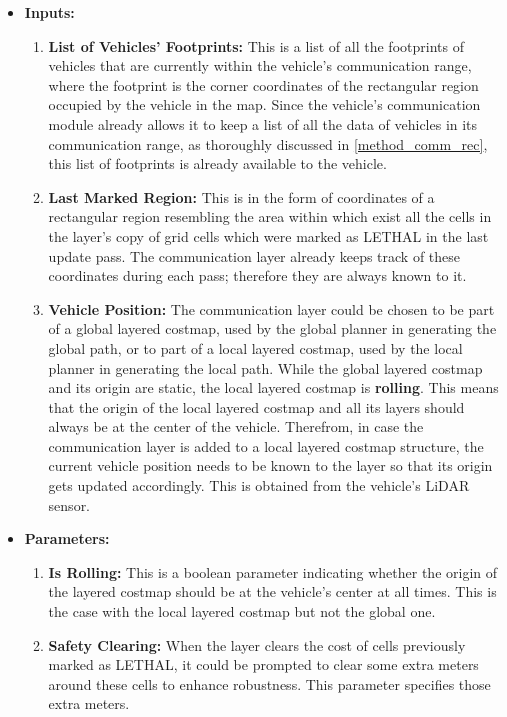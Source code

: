 \begin{enumerate}
    \begin{itemize}
        \item \textbf{Inputs:}
        \begin{enumerate}
            \item \textbf{List of Vehicles' Footprints:} This is a list of all the footprints of vehicles that are currently within the vehicle’s communication range, where the footprint is the corner coordinates of the rectangular region occupied by the vehicle in the map. Since the vehicle’s communication module already allows it to keep a list of all the data of vehicles in its communication range, as thoroughly discussed in \ref{method_comm_rec}, this list of footprints is already available to the vehicle.
            \item \textbf{Last Marked Region:} This is in the form of coordinates of a rectangular region resembling the area within which exist all the cells in the layer’s copy of grid cells which were marked as LETHAL in the last update pass. The communication layer already keeps track of these coordinates during each pass; therefore they are always known to it.
            \item \textbf{Vehicle Position:} The communication layer could be chosen to be part of a global layered costmap, used by the global planner in generating the global path, or to part of a local layered costmap, used by the local planner in generating the local path. While the global layered costmap and its origin are static, the local layered costmap is \textbf{rolling}. This means that the origin of the local layered costmap and all its layers should always be at the center of the vehicle. Therefrom, in case the communication layer is added to a local layered costmap structure, the current vehicle position needs to be known to the layer so that its origin gets updated accordingly. This is obtained from the vehicle’s LiDAR sensor.
        \end{enumerate}
        \item \textbf{Parameters:}
        \begin{enumerate}
            \item \textbf{Is Rolling:} This is a boolean parameter indicating whether the origin of the layered costmap should be at the vehicle’s center at all times. This is the case with the local layered costmap but not the global one.
            \item \textbf{Safety Clearing:} When the layer clears the cost of cells previously marked as LETHAL, it could be prompted to clear some extra meters around these cells to enhance robustness. This parameter specifies those extra meters.
        \end{enumerate}
    \end{itemize}
    

\end{enumerate}
